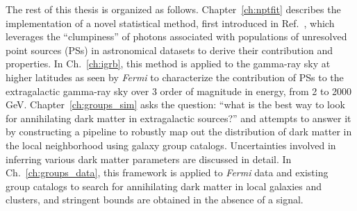 The rest of this thesis is organized as follows. Chapter~\ref{ch:nptfit} describes the implementation of a novel statistical method, first introduced in Ref.~\cite{Lee:2015fea}, which leverages the ``clumpiness'' of photons associated with populations of unresolved point sources (PSs) in astronomical datasets to derive their contribution and properties. In Ch.~\ref{ch:igrb}, this method is applied to the gamma-ray sky at higher latitudes as seen by \emph{Fermi} to characterize the contribution of PSs to the extragalactic gamma-ray sky over 3 order of magnitude in energy, from 2 to 2000 GeV. Chapter~\ref{ch:groups_sim} asks the question: ``what is the best way to look for annihilating dark matter in extragalactic sources?'' and attempts to answer it by constructing a pipeline to robustly map out the distribution of dark matter in the local neighborhood using galaxy group catalogs. Uncertainties involved in inferring various dark matter parameters are discussed in detail. In Ch.~\ref{ch:groups_data}, this framework is applied to \emph{Fermi} data and existing group catalogs to search for annihilating dark matter in local galaxies and clusters, and stringent bounds are obtained in the absence of a signal. 


